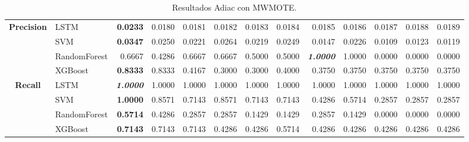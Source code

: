 \begin{table}[H]
\begin{adjustbox}{max width=14cm}
\begin{tabular}{|c|l|r|r|r|r|r|r|r|r|r|r|r|}
			\hline
			\textbf{Precision} &  LSTM & \textbf{  0.0233 } &  0.0180 &  0.0181 &  0.0182 &  0.0183 &  0.0184 &  0.0185 &  0.0186 &  0.0187 &  0.0188 &  0.0189 \\
			&  SVM & \textbf{  0.0347 } &  0.0250 &  0.0221 &  0.0264 &  0.0219 &  0.0249 &  0.0147 &  0.0226 &  0.0109 &  0.0123 &  0.0119 \\
			&  RandomForest &  0.6667 &  0.4286 &  0.6667 &  0.6667 &  0.5000 &  0.5000 & \textit{ \textbf{  1.0000 } } &  1.0000 &  0.0000 &  0.0000 &  0.0000 \\
			&  XGBoost & \textbf{  0.8333 } &  0.8333 &  0.4167 &  0.3000 &  0.3000 &  0.4000 &  0.3750 &  0.3750 &  0.3750 &  0.3750 &  0.3750 \\
			\hline
			\textbf{Recall} &  LSTM & \textit{ \textbf{  1.0000 } } &  1.0000 &  1.0000 &  1.0000 &  1.0000 &  1.0000 &  1.0000 &  1.0000 &  1.0000 &  1.0000 &  1.0000 \\
			&  SVM & \textbf{  1.0000 } &  0.8571 &  0.7143 &  0.8571 &  0.7143 &  0.7143 &  0.4286 &  0.5714 &  0.2857 &  0.2857 &  0.2857 \\
			&  RandomForest & \textbf{  0.5714 } &  0.4286 &  0.2857 &  0.2857 &  0.1429 &  0.1429 &  0.2857 &  0.1429 &  0.0000 &  0.0000 &  0.0000 \\
			&  XGBoost & \textbf{  0.7143 } &  0.7143 &  0.7143 &  0.4286 &  0.4286 &  0.5714 &  0.4286 &  0.4286 &  0.4286 &  0.4286 &  0.4286 \\
			\hline
		\end{tabular}
	\end{adjustbox}
	\caption{Resultados Adiac con MWMOTE.}
	\label{tab:Adiac_MWMOTE}
\end{table}
